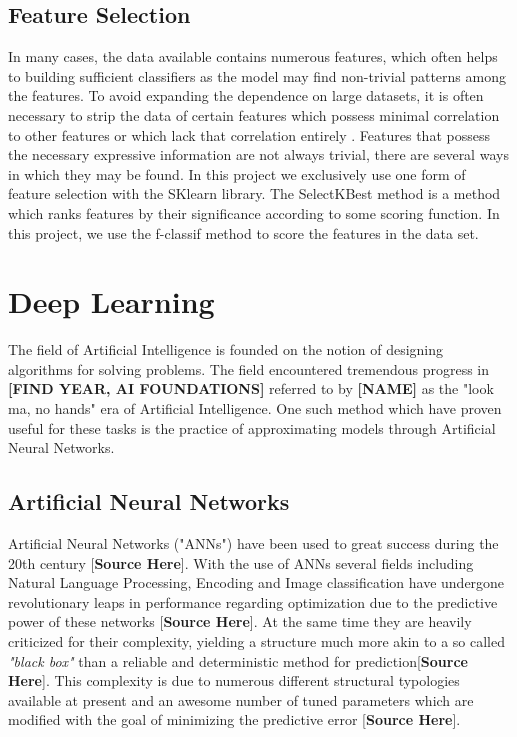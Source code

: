 \subsection{Feature Selection}

In many cases, the data available contains numerous features, which often helps to building sufficient classifiers as the model may find non-trivial patterns among the features. To avoid expanding the dependence on large datasets, it is often necessary to strip the data of certain features which possess minimal correlation to other features or which lack that correlation entirely \cite{dash1997feature}. Features that possess the necessary expressive information are not always trivial, there are several ways in which they may be found. In this project we exclusively use one form of feature selection with the SKlearn library. The SelectKBest method is a method which ranks features by their significance according to some scoring function. In this project, we use the f-classif method to score the features in the data set.


\section{Deep Learning}

The field of Artificial Intelligence is founded on the notion of designing algorithms for solving problems. The field encountered tremendous progress in \textbf{[FIND YEAR, AI FOUNDATIONS]} referred to by \textbf{[NAME]} as the "look ma, no hands" era of Artificial Intelligence. One such method which have proven useful for these tasks is the practice of approximating models through Artificial Neural Networks.

\subsection{Artificial Neural Networks}
Artificial Neural Networks ("ANNs") have been used to great success during the 20th century [\textbf{Source Here}]. With the use of ANNs
several fields including Natural Language Processing, Encoding and Image classification have undergone revolutionary leaps in performance regarding optimization due to the predictive power of these networks [\textbf{Source Here}]. At the same time they are heavily criticized for their complexity, yielding a structure much more akin to a so called \textit{"black box"} than a reliable and deterministic method for prediction[\textbf{Source Here}]. This complexity is due to numerous different structural typologies available at present and an awesome number of tuned parameters which are modified with the goal of minimizing the predictive error [\textbf{Source Here}].

